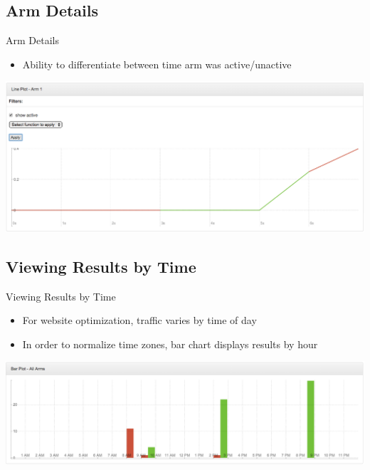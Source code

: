 \documentclass{beamer}
\begin{document}
\subsection{Arm Details}
\begin{frame}{Arm Details}
\begin{itemize}
\item Ability to differentiate between time arm was active/unactive
\end{itemize}
\includegraphics[scale=0.25]{linechartactive.png}
\end{frame}

\subsection{Viewing Results by Time}
\begin{frame}{Viewing Results by Time}
\begin{itemize}
\item For website optimization, traffic varies by time of day
\item In order to normalize time zones, bar chart displays results by hour
\end{itemize}
\includegraphics[scale=0.25]{barcharttime.png}
\end{frame}
\end{document}
